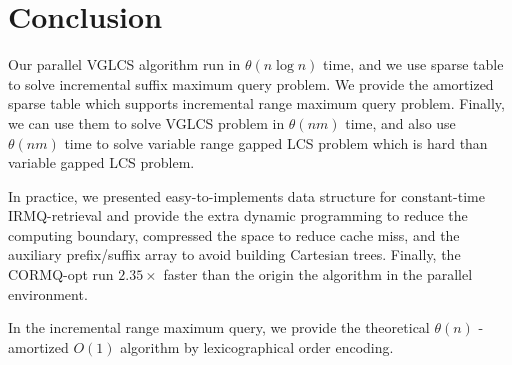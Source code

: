\section{Conclusion}
\label{sec:Conclusion}

Our parallel VGLCS algorithm run in $\theta(n \log n)$ time, and we use
sparse table to solve incremental suffix maximum query problem.  We
provide the amortized sparse table which supports incremental range
maximum query problem.  Finally, we can use them to solve VGLCS problem
in $\theta(nm)$ time, and also use $\theta(nm)$ time to solve variable
range gapped LCS problem which is hard than variable gapped LCS problem.

In practice, we presented easy-to-implements data structure for
constant-time IRMQ-retrieval and provide the extra dynamic programming to
reduce the computing boundary, compressed the space to reduce cache
miss, and the auxiliary prefix/suffix array to avoid building
Cartesian trees. Finally, the CORMQ-opt run $2.35 \times$ faster than
the origin the algorithm in the parallel environment.

In the incremental range maximum query, we provide the theoretical
$\theta(n)$ - amortized $O(1)$ algorithm by lexicographical order
encoding.

\iffalse
我們修改 VGLCS 的序列算法，將其平行化於 $\theta(n \log n)$ 時間內，
並以稀疏表實作 ISMQ 問題。提出的稀疏表能解決比 VGLCS 更困難的 Variable Range Gapped LCS，
致使 VIGLCS 可在時間複雜度 $\theta(nm)$ 被解決。

在實務上，我們提供以動態規劃減少計算量，以及使用空間壓縮降低快取未中的策略，
最終平行 RMQ 獲取 $2.35 \times$ 倍的加速；在增長區間最大值詢問 (IRMQ) 問題中，
以字典順序的編碼策略，提出理論 $\theta(n)$ -- amortized $\theta(1)$  的算法。
\fi